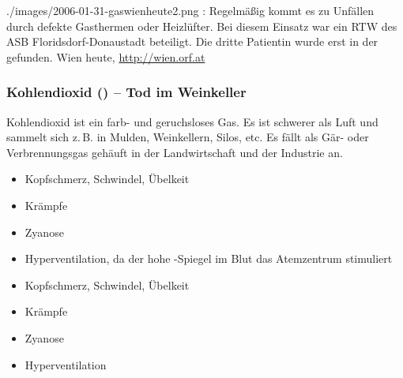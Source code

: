 % 

{}
{}
{}
{./images/2006-01-31-gaswienheute2.png}
{:
Regel\-mäß\-ig kommt es zu Unfällen durch defekte Gasthermen
oder Heizlüfter. Bei diesem Einsatz war ein RTW des ASB
Floridsdorf-Donaustadt beteiligt. Die dritte Patientin
wurde erst  in der
 gefunden.}
{Wien heute, \url{http://wien.orf.at}}

\subsubsection{Kohlendioxid (\texorpdfstring{}{CO2}) -- Tod im Weinkeller}


Kohlendioxid ist ein farb- und geruchsloses Gas. Es ist
schwerer als Luft und sammelt sich z.\,B. in Mulden,
Weinkellern, Silos, etc. Es fällt als Gär- oder
Verbrennungsgas gehäuft in der Landwirtschaft und der
Industrie an.


{%
\begin{itemize}
  \item Kopfschmerz, Schwindel, Übelkeit
  \item Krämpfe
  \item Zyanose
  \item Hyperventilation, da der hohe
  -Spiegel im Blut das Atemzentrum stimuliert
\end{itemize}
}{
\begin{itemize}
  \item Kopfschmerz, Schwindel, Übelkeit
  \item Krämpfe
  \item Zyanose
  \item Hyperventilation
\end{itemize}
}{}{}{}


